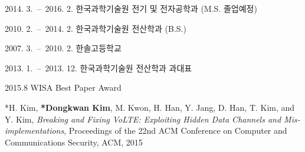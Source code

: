 \curriculumvitae[korean]
  \begin{personaldata}
    \address  {대전 유성구 구성동 한국과학기술원 N26 (CHiPS 동) 201호}
  \end{personaldata}

  \begin{education}
    \item[2014. 3.\ --\ 2016. 2.] 한국과학기술원 전기 및 전자공학과 (M.S. 졸업예정)
    \item[2010. 2.\ --\ 2014. 2.] 한국과학기술원 전산학과 (B.S.)
    \item[2007. 3.\ --\ 2010. 2.] 한솔고등학교
  \end{education}

  \begin{career}
    \item[2013. 1.\ --\ 2013. 12.] 한국과학기술원 전산학과 과대표
  \end{career}

  \begin{activity}
    \item[2015.8] WISA Best Paper Award
  \end{activity}

  \begin{publication}
    *H. Kim, \textbf{*Dongkwan Kim}, M. Kwon, H. Han, Y. Jang, D. Han, T. Kim,
    and Y. Kim,
    \emph{Breaking and Fixing VoLTE: Exploiting Hidden Data Channels and
    Mis-implementations},
    Proceedings of the 22nd ACM Conference on Computer and Communications
    Security,
    ACM,
    2015

  \end{publication}
